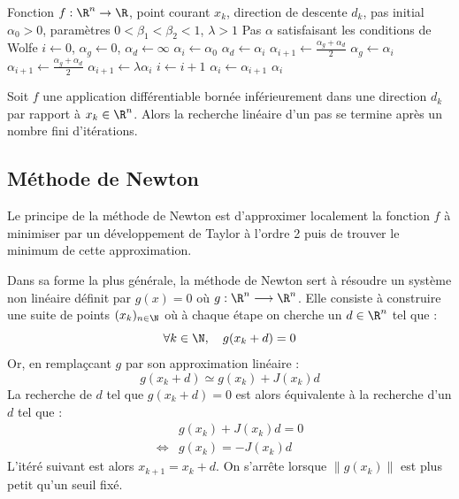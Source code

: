\begin{algorithm}[H]
    \caption{Recherche linéaire satisfaisant les conditions de Wolfe}
        \begin{algorithmic}[1]
        \Require Fonction $f : \R^n \to \R$, point courant $x_k$, direction de descente $d_k$, pas initial $\alpha_0 > 0$, paramètres $0 < \beta_1 < \beta_2 < 1$, $\lambda > 1$
        \Ensure Pas $\alpha$ satisfaisant les conditions de Wolfe
        \State $i \gets 0$, $\alpha_g \gets 0$, $\alpha_d \gets \infty$
        \State $\alpha_i \gets \alpha_0$
                \State $\alpha_d \gets \alpha_i$ 
                \State $\alpha_{i+1} \gets \frac{\alpha_g + \alpha_d}{2}$
                \State $\alpha_g \gets \alpha_i$ 
                    \State $\alpha_{i+1} \gets \frac{\alpha_g + \alpha_d}{2}$
                \Else
                    \State $\alpha_{i+1} \gets \lambda \alpha_i$
                \EndIf
            \EndIf
            \State $i \gets i + 1$
            \State $\alpha_i \gets \alpha_{i+1}$
        \EndWhile
        \State \Return $\alpha_i$
    \end{algorithmic}
\end{algorithm}


\begin{theorem}
    Soit $f$ une application différentiable bornée inférieurement dans une direction $d_k$ 
    par rapport à $x_k \in \R^n$. Alors la recherche linéaire d'un pas se termine après un nombre 
    fini d'itérations. 
\end{theorem}

\subsection{Méthode de Newton}

Le principe de la méthode de Newton est d'approximer localement la fonction $f$ à minimiser 
par un développement de Taylor à l'ordre 2 puis de trouver le minimum de cette approximation. 

Dans sa forme la plus générale, la méthode de Newton sert à résoudre un système non linéaire 
définit par $g(x) = 0$ où $ g : \R^n \longrightarrow \R^n$. Elle consiste 
à construire une suite de points $(x_k)_{n \in \N}$ où à chaque étape on cherche un $d \in \R^n$ tel que :
    $$ \forall k \in \N, \quad g(x_k + d) = 0 $$ 
Or, en remplaçcant $g$ par son approximation linéaire : 
    $$
        g(x_k + d) \simeq g(x_k) + J(x_k)d
    $$
La recherche de $d$ tel que $g(x_k + d) = 0$ est alors équivalente à la recherche d'un $d$ tel que : 
    \begin{align*}
        & g(x_k) + J(x_k)d = 0 \\ 
        \iff & g(x_k) = - J(x_k)d 
    \end{align*}
L'itéré suivant est alors $x_{k+1} = x_k + d$. On s'arrête lorsque $\| g(x_k) \|$ est plus petit qu'un seuil fixé. 

